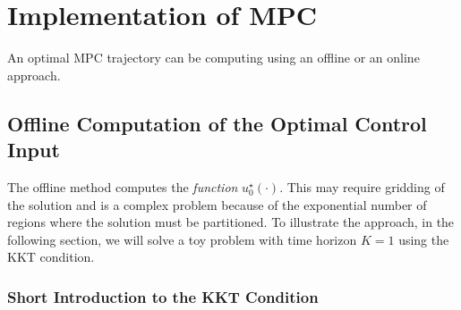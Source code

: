 

\section{Implementation of MPC}
\label{sec:implementation-MPC}

An optimal MPC trajectory can be computing using an offline or an online approach.

\subsection{Offline Computation of the Optimal Control Input}
\label{sec:offline-computation-MPC}

The offline method computes the \emph{function} $u_0^\star(\cdot)$. This may require gridding of the solution and is a complex problem because of the exponential number of regions where the solution must be partitioned. To illustrate the approach, in the following section, we will solve a toy problem with time horizon $K=1$ using the KKT condition.

\subsubsection{Short Introduction to the KKT Condition}
\label{sec:short-intro-KKT}

